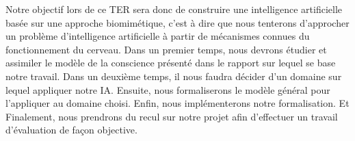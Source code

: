 Notre objectif lors de ce TER sera donc de construire une intelligence artificielle basée sur une approche biomimétique, c'est à dire que nous tenterons d'approcher un problème d'intelligence artificielle à partir de mécanismes connues du fonctionnement du cerveau. Dans un premier temps, nous devrons étudier et assimiler le modèle de la conscience présenté dans le rapport sur lequel se base notre travail. Dans un deuxième temps, il nous faudra décider d'un domaine sur lequel appliquer notre IA. Ensuite, nous formaliserons le modèle général pour l'appliquer au domaine choisi. Enfin, nous implémenterons notre formalisation. Et Finalement, nous prendrons du recul sur notre projet afin d'effectuer un travail d'évaluation de façon objective.
